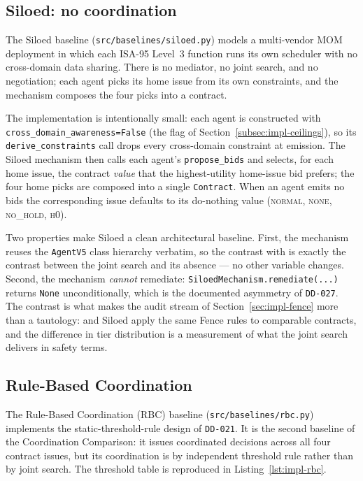 \subsection{Siloed: no coordination}
\label{subsec:impl-siloed}

The Siloed baseline (\texttt{src/baselines/siloed.py}) models a
multi-vendor MOM deployment in which each ISA-95 Level~3 function runs
its own scheduler with no cross-domain data sharing. There is no
mediator, no joint search, and no negotiation; each agent picks its
home issue from its own constraints, and the mechanism composes the
four picks into a contract.

The implementation is intentionally small: each agent is constructed
with \texttt{cross\_domain\_awareness=False} (the flag of
Section~\ref{subsec:impl-ceilings}), so its
\texttt{derive\_constraints} call drops every cross-domain constraint
at emission. The Siloed mechanism then calls each agent's
\texttt{propose\_bids} and selects, for each home issue, the contract
\emph{value} that the highest-utility home-issue bid prefers; the four
home picks are composed into a single \texttt{Contract}. When an agent
emits no bids the corresponding issue defaults to its do-nothing value
(\textsc{normal}, \textsc{none}, \textsc{no\_hold}, \textsc{h0}).

Two properties make Siloed a clean architectural baseline. First, the
mechanism reuses the \texttt{AgentV5} class hierarchy verbatim, so the
contrast with \NEXUS{} is exactly the contrast between the joint search
and its absence --- no other variable changes. Second, the mechanism
\emph{cannot} remediate: \texttt{SiloedMechanism.remediate(...)}
returns \texttt{None} unconditionally, which is the documented
asymmetry of \texttt{DD-027}. The contrast is what makes the audit
stream of Section~\ref{sec:impl-fence} more than a tautology: \NEXUS{}
and Siloed apply the same Fence rules to comparable contracts, and the
difference in tier distribution is a measurement of what the joint
search delivers in safety terms.

\subsection{Rule-Based Coordination}
\label{subsec:impl-rbc}

The Rule-Based Coordination (RBC) baseline (\texttt{src/baselines/rbc.py})
implements the static-threshold-rule design of \texttt{DD-021}. It is
the second baseline of the Coordination Comparison: it issues
coordinated decisions across all four contract issues, but its
coordination is by independent threshold rule rather than by joint
search. The threshold table is reproduced in
Listing~\ref{lst:impl-rbc}.

